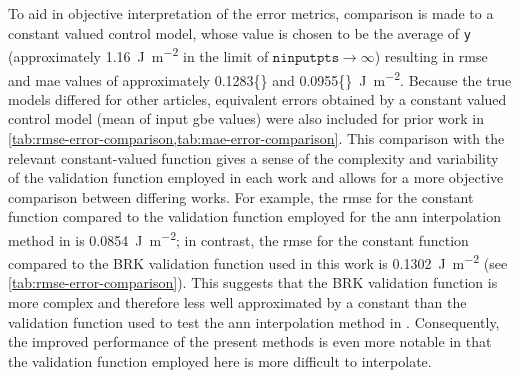 \documentclass[final,twocolumn,12pt]{elsarticle}
\newcommand{\inpt}{input}
\newcommand{\inptvar}{ninputpts}
\newcommand{\avgrmse}{0.1283}
\newcommand{\avgmae}{0.0955}
\begin{document}
{%

To aid in objective interpretation of the error metrics, comparison is made to a constant valued control model, whose value is chosen to be the average of \texttt{y} (approximately \SI{1.16}{\J\per\square\meter} in the limit of $\texttt{\inptvar{}} \rightarrow \infty$) resulting in \gls{rmse} and \gls{mae} values of approximately \num{\avgrmse{}} and \SI{\avgmae{}}{\J\per\square\meter}. Because the true models differed for other articles, equivalent errors obtained by a constant valued control model (mean of \inpt{} \gls{gbe} values) were also included for prior work in \cref{tab:rmse-error-comparison,tab:mae-error-comparison}. This comparison with the relevant constant-valued function gives a sense of the complexity and variability of the validation function employed in each work and allows for a more objective comparison between differing works. For example, the \gls{rmse} for the constant function compared to the validation function employed for the \gls{ann} interpolation method in \cite{restrepoUsingArtificialNeural2014} is \SI{0.0854}{\J\per\square\meter}; in contrast, the \gls{rmse} for the constant function compared to the BRK validation function used in this work is \SI{0.1302}{\J\per\square\meter} (see \cref{tab:rmse-error-comparison}). This suggests that the BRK validation function is more complex and therefore less well approximated by a constant than the validation function used to test the \gls{ann} interpolation method in \cite{restrepoUsingArtificialNeural2014}. Consequently, the improved performance of the present methods is even more notable in that the validation function employed here is more difficult to interpolate.

}
\end{document}
